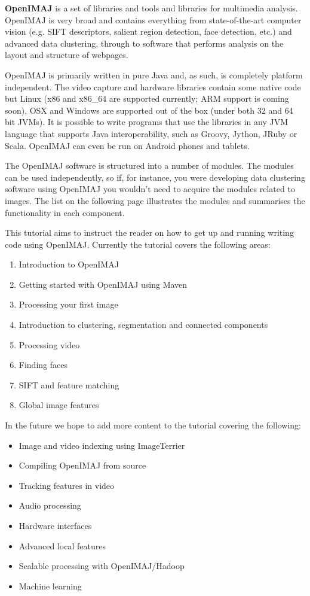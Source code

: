 \documentclass[10pt,a4paper,twoside,extrafontsizes]{memoir}
\begin{document}
\textbf{OpenIMAJ} is a set of libraries and tools and libraries for multimedia analysis. 
OpenIMAJ is very broad and contains everything from state-of-the-art computer 
vision (e.g. SIFT descriptors, salient region detection, face detection, etc.) 
and advanced data clustering, through to software that performs analysis on the 
layout and structure of webpages.

OpenIMAJ is primarily written in pure Java and, as such, is completely platform 
independent. The video capture and hardware libraries contain some native code 
but Linux (x86 and x86\_64 are supported currently; ARM support is coming soon), 
OSX and Windows are supported out of the box (under both 32 and 64 bit JVMs). 
It is possible to write programs that use the libraries in any JVM language 
that supports Java interoperability, such as Groovy, Jython, JRuby or 
Scala. OpenIMAJ can even be run on Android phones and tablets.

The OpenIMAJ software is structured into a number of modules. The modules 
can be used independently, so if, for instance, you were developing data 
clustering software using OpenIMAJ you wouldn't need to acquire the modules related 
to images. The list on the following page illustrates the modules 
and summarises the functionality in each component.

This tutorial aims to instruct the reader on how to get up and running
writing code using OpenIMAJ. Currently the tutorial covers the following areas:
\begin{enumerate}
	\item Introduction to OpenIMAJ
	\item Getting started with OpenIMAJ using Maven
	\item Processing your first image
	\item Introduction to clustering, segmentation and connected components
	\item Processing video
	\item Finding faces
	\item SIFT and feature matching
	\item Global image features
\end{enumerate}

In the future we hope to add more content to the tutorial covering the following:
\begin{itemize}
	\item Image and video indexing using ImageTerrier
	\item Compiling OpenIMAJ from source
	\item Tracking features in video
	\item Audio processing
	\item Hardware interfaces
	\item Advanced local features
	\item Scalable processing with OpenIMAJ/Hadoop
	\item Machine learning
\end{itemize}
\end{document}
